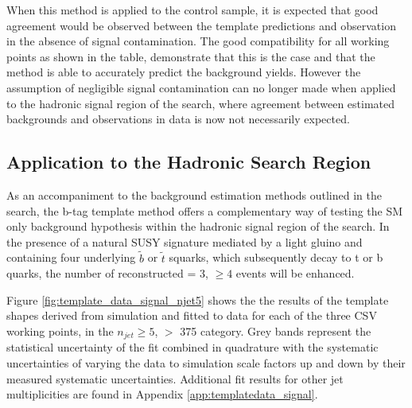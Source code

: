 When this method is applied to the \mupjets control sample, it is expected that good agreement would be observed between the template predictions and observation in the absence of signal contamination. The good compatibility for all working points as shown in the table, demonstrate that this is the case and that the method is able to accurately predict the background yields. However the assumption of negligible signal contamination can no longer made when applied to the hadronic signal region of the \alphat search, where agreement between estimated backgrounds and observations in data is now not necessarily expected.
 
\subsection{Application to the \alphat Hadronic Search Region}
\label{subsec:templatedataresults}

As an accompaniment to the background estimation methods outlined in the \alphat search, the b-tag template method offers a complementary way of testing the \ac{SM} only background hypothesis within the hadronic signal region of the search. In the presence of a natural \ac{SUSY} signature mediated by a light gluino and containing four underlying $\widetilde{b}$ or $\widetilde{t}$ squarks, which subsequently decay to t or b quarks, the number of reconstructed \nbreco = 3, $\geq 4$ events will be enhanced.

Figure \ref{fig:template_data_signal_njet5} shows the  the results of the template shapes derived from simulation and fitted to data for each of the three \ac{CSV} working points, in the $n_{jet} \geq 5$, \theht $>$ 375 \GeV category.  Grey bands represent the statistical uncertainty of the fit combined in quadrature with the systematic uncertainties of varying the data to simulation scale factors up and down by their measured systematic uncertainties.  Additional fit results for other jet multiplicities are found in Appendix \ref{app:templatedata_signal}.


